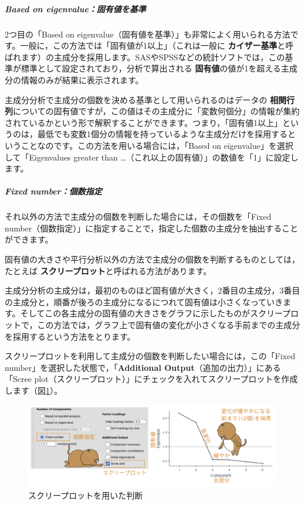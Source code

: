 \documentclass[
  12pt,
  a5jpaper,
  lualatex, ja=standard]{bxjsbook}
\renewcommand{\emph}[1]{\textbf{\color{emph} #1}}
\begin{document}
\hypertarget{subsub:factor-pca-component-eigen}{%
\subparagraph*{Based on eigenvalue：固有値を基準}\label{subsub:factor-pca-component-eigen}}

2つ目の「Based on eigenvalue（固有値を基準）」も非常によく用いられる方法です。一般に，この方法では「固有値が1以上」（これは一般に\emph{カイザー基準}と呼ばれます）の主成分を採用します。SASやSPSSなどの統計ソフトでは，この基準が標準として設定されており，分析で算出される\emph{固有値}の値が1を超える主成分の情報のみが結果に表示されます。

主成分分析で主成分の個数を決める基準として用いられるのはデータの\emph{相関行列}についての固有値ですが，この値はその主成分に「変数何個分」の情報が集約されているかという形で解釈することができます。つまり，「固有値1以上」というのは，最低でも変数1個分の情報を持っているような主成分だけを採用するということなのです。この方法を用いる場合には，「Based on eigenvalue」を選択して「Eigenvalues greater than \ldots（これ以上の固有値）」の数値を「1」に設定します。

\hypertarget{subsub:factor-pca-fixednumber}{%
\subparagraph*{Fixed number：個数指定}\label{subsub:factor-pca-fixednumber}}

それ以外の方法で主成分の個数を判断した場合には，その個数を「Fixed number（個数指定）」に指定することで，指定した個数の主成分を抽出することができます。

固有値の大きさや平行分析以外の方法で主成分の個数を判断するものとしては，たとえば\emph{スクリープロット}と呼ばれる方法があります。

主成分分析の主成分は，最初のものほど固有値が大きく，2番目の主成分，3番目の主成分と，順番が後ろの主成分になるにつれて固有値は小さくなっていきます。そしてこの各主成分の固有値の大きさをグラフに示したものがスクリープロットで，この方法では，グラフ上で固有値の変化が小さくなる手前までの主成分を採用するという方法をとります。

スクリープロットを利用して主成分の個数を判断したい場合には，この「Fixed number」を選択した状態で，「\textbf{Additional Output}（追加の出力）」にある「Scree plot（スクリープロット）」にチェックを入れてスクリープロットを作成します（図\ref{fig:factor-pca-scree}）。

\begin{figure}[!ht]

{\centering \includegraphics[width=1\linewidth]{images/factor/pca-scree} 

}

\caption{スクリープロットを用いた判断}\label{fig:factor-pca-scree}
\end{figure}
\end{document}
